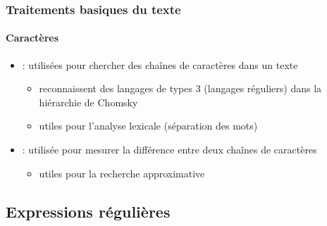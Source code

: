 \documentclass[xcolor=table]{beamer}
\begin{document}
\begin{frame}
\frametitle{Traitements basiques du texte}
\framesubtitle{Caractères}

\begin{itemize}
	\item {} : utilisées pour chercher des chaînes de caractères dans un texte
	\begin{itemize}
		\item reconnaissent des langages de types 3 (langages réguliers) dans la hiérarchie de Chomsky 
		\item utiles pour l'analyse lexicale (séparation des mots)
	\end{itemize}
	\item {} : utilisée pour mesurer la différence entre deux chaînes de caractères 
	\begin{itemize}
		\item utiles pour la recherche approximative
	\end{itemize}
\end{itemize}

\end{frame}

\subsection{Expressions régulières}
\end{document}
